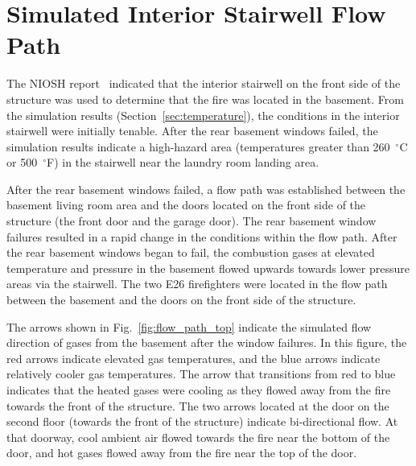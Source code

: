\documentclass[12pt,oneside]{book}
\begin{document}
\section{Simulated Interior Stairwell Flow Path}
\label{sec:simulated_flow_path}

The NIOSH report~\cite{NIOSH:Bowyer2} indicated that the interior stairwell on the front side of the structure was used to determine that the fire was located in the basement. From the simulation results (Section~\ref{sec:temperature}), the conditions in the interior stairwell were initially tenable. After the rear basement windows failed, the simulation results indicate a high-hazard area (temperatures greater than 260~$^{\circ}$C or 500~$^{\circ}$F) in the stairwell near the laundry room landing area.

After the rear basement windows failed, a flow path was established between the basement living room area and the doors located on the front side of the structure (the front door and the garage door). The rear basement window failures resulted in a rapid change in the conditions within the flow path. After the rear basement windows began to fail, the combustion gases at elevated temperature and pressure in the basement flowed upwards towards lower pressure areas via the stairwell. The two E26 firefighters were located in the flow path between the basement and the doors on the front side of the structure.

The arrows shown in Fig.~\ref{fig:flow_path_top} indicate the simulated flow direction of gases from the basement after the window failures. In this figure, the red arrows indicate elevated gas temperatures, and the blue arrows indicate relatively cooler gas temperatures. The arrow that transitions from red to blue indicates that the heated gases were cooling as they flowed away from the fire towards the front of the structure. The two arrows located at the door on the second floor (towards the front of the structure) indicate bi-directional flow. At that doorway, cool ambient air flowed towards the fire near the bottom of the door, and hot gases flowed away from the fire near the top of the door.
\end{document}
